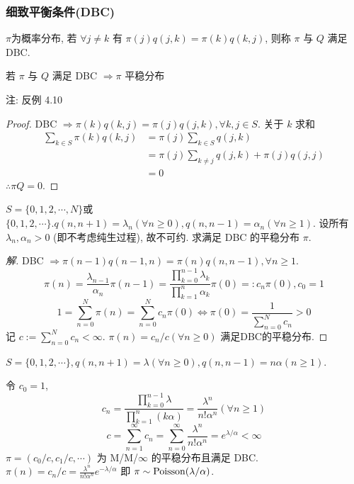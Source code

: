 \subsubsection{细致平衡条件(DBC)}

\begin{definition}
    $\pi$为概率分布, 若 $\forall j\neq k$ 有 $\pi(j)q(j,k)=\pi(k)q(k,j)$, 则称 $\pi$ 与 $Q$ 满足DBC.
\end{definition}

\begin{theorem}
    若 $\pi$ 与 $Q$ 满足 DBC $\Rightarrow \pi$ 平稳分布

    注: 反例 4.10
\end{theorem}

\begin{proof}
    DBC $\Rightarrow \pi(k)q(k,j)=\pi(j)q(j,k),\forall k,j\in S$. 关于 $k$ 求和
    \[
    \begin{aligned}
        \sum_{k\in S}\pi(k)q(k,j) &=\pi(j)\sum_{k\in S}q(j,k)\\
        &=\pi(j)\sum_{k\neq j}q(j,k)+\pi(j)q(j,j)\\
        &=0
    \end{aligned}
    \]
    $\therefore \pi Q=0$.
\end{proof}

\begin{example}[生灭链]\label{exa:p136-exa4.12}
    $S=\{0,1,2,\cdots,N\}$或$\{0,1,2,\cdots\}. q(n,n+1)=\lambda_n(\forall n\geq 0), q(n,n-1)=\alpha_n (\forall n\geq 1)$. 设所有 $\lambda_n,\alpha_n>0$ (即不考虑纯生过程), 故不可约. 求满足 DBC 的平稳分布 $\pi$.
\end{example}

\begin{proof}[解]
    DBC $\Rightarrow \pi(n-1)q(n-1,n)=\pi(n)q(n,n-1), \forall n\geq 1$.
    \[
    \pi(n)=\frac{\lambda_{n-1}}{\alpha_n}\pi(n-1)=\frac{\prod_{k=0}^{n-1}\lambda_k}{\prod_{k=1}^n\alpha_k}\pi(0)=:c_n \pi(0), c_0=1
    \]
    \[
    1=\sum_{n=0}^N \pi(n)=\sum_{n=0}^N c_n\pi(0)\iff \pi(0)=\frac{1}{\sum_{n=0}^N c_n}>0
    \]
    记 $c:=\sum_{n=0}^N c_n<\infty$. $\pi(n)=c_n/c(\forall n\geq 0)$ 满足DBC的平稳分布.
\end{proof}

\begin{example}
    $S=\{0,1,2,\cdots\},q(n,n+1)=\lambda(\forall n\geq 0), q(n,n-1)=n\alpha(n\geq 1)$.    
\end{example}

令 $c_0=1$,
\[
c_n=\frac{\prod_{k=0}^{n-1}\lambda}{\prod_{k=1}^n(k\alpha)}=\frac{\lambda^n}{n!\alpha^n}(\forall n\geq 1)
\]
\[
c=\sum_{n=1}^{\infty}c_n=\sum_{n=0}^{\infty}\frac{\lambda^n}{n!\alpha^n}=e^{\lambda/\alpha}<\infty
\]
$\pi=(c_0/c, c_1/c, \cdots)$ 为 M/M/$\infty$ 的平稳分布且满足 DBC. $\pi(n)=c_n/c=\frac{\lambda^n}{n!\alpha^n}e^{-\lambda/\alpha}$ 即 $\pi\sim \operatorname{Poisson}(\lambda/\alpha)$.

